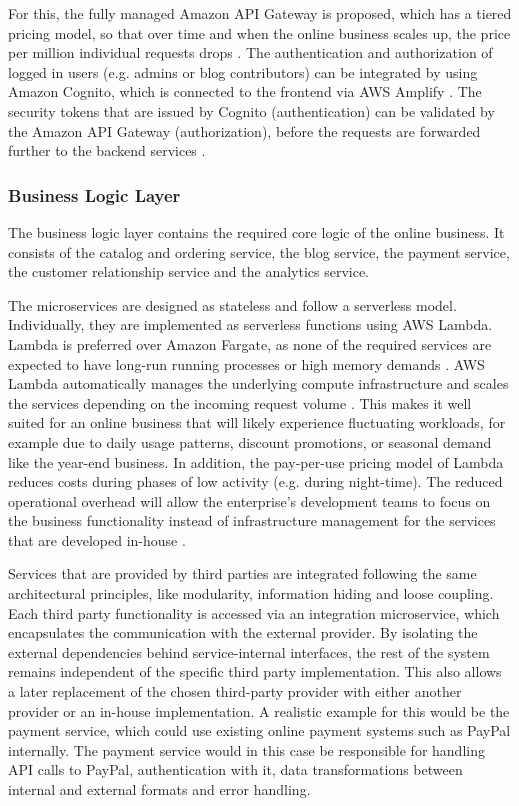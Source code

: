 \documentclass[12pt,a4paper]{article}
\begin{document}
For this, the fully managed Amazon API Gateway is proposed, which has a tiered pricing model, so that over time and when the online business scales up, the price per million individual requests drops  \cite{aws_apigateway_overview}. The authentication and authorization of logged in users (e.g. admins or blog contributors) can be integrated by using Amazon Cognito, which is connected to the frontend via AWS Amplify \cite{aws_integrate_cognito}. The security tokens that are issued by Cognito (authentication) can be validated by the Amazon API Gateway (authorization), before the requests are forwarded further to the backend services \cite{aws_apigateway_cognito}.

\subsubsection{Business Logic Layer}

The business logic layer contains the required core logic of the online business. It consists of the catalog and ordering service, the blog service, the payment service, the customer relationship service and the analytics service.

The microservices are designed as stateless and follow a serverless model. Individually, they are implemented as serverless functions using AWS Lambda. Lambda is preferred over Amazon Fargate, as none of the required services are expected to have long-run running processes or high memory demands \cite{aws_lambda_or_fargate}. AWS Lambda automatically manages the underlying compute infrastructure and scales the services depending on the incoming request volume \cite{aws_lambda}. This makes it well suited for an online business that will likely experience fluctuating workloads, for example due to daily usage patterns, discount promotions, or seasonal demand like the year-end business. In addition, the pay-per-use pricing model of Lambda reduces costs during phases of low activity (e.g. during night-time). The reduced operational overhead will allow the enterprise's development teams to focus on the business functionality instead of infrastructure management for the services that are developed in-house \cite{aws_lambda}.

Services that are provided by third parties are integrated following the same architectural principles, like  modularity, information hiding and loose coupling. Each third party functionality is accessed via an integration microservice, which encapsulates the communication with the external provider. By isolating the external dependencies behind service-internal interfaces, the rest of the system remains independent of the specific third party implementation. This also allows a later replacement of the chosen third-party provider with either another provider or an in-house implementation. A realistic example for this would be the payment service, which could use existing online payment systems such as PayPal internally. The payment service would in this case be responsible for handling API calls to PayPal, authentication with it, data transformations between internal and external formats and error handling.
\end{document}
